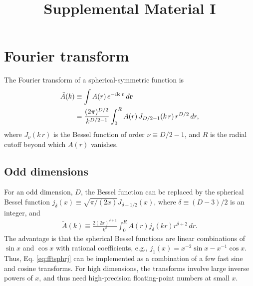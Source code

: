 \documentclass[aip,jcp,preprint,superscriptaddress,showpacs,preprintnumbers,amsmath,amssymb]{revtex4-1}
\numberwithin{equation}{section}
\newcommand{\vct}[1]{\mathbf{#1}}
\providecommand{\vr}{} %
\renewcommand{\vr}{\vct{r}}
\newcommand{\vk}{\vct{k}}
\begin{document}
\title{Supplemental Material I}
\maketitle





\section{Fourier transform}





The Fourier transform of a spherical-symmetric function is
%
%
%
\begin{align}
  \tilde A(k)
&\equiv
  \int A(r) \, e^{-i\vk \cdot \vr} \, d\vr
  \notag \\
&=
  \frac{ (2\pi)^{D/2} }
       { k^{D/2-1} }
  \int_0^R A(r) \, J_{D/2-1}(k \, r) \, r^{D/2} \, dr,
\label{eq:fftsphr}
\end{align}
%
%
%
where $J_\nu(k \, r)$ is the Bessel function
of order $\nu \equiv D/2-1$,
and $R$ is the radial cutoff beyond which $A(r)$ vanishes.





\subsection{Odd dimensions}





For an odd dimension, $D$,
the Bessel function can be replaced
by the spherical Bessel function\cite{arfken}
$j_\delta(x) \equiv \sqrt{\pi/(2x)} J_{\delta + 1/2}(x)$,
where $\delta \equiv (D - 3)/2$ is an integer,
and
%
%
%
\begin{align}
\tilde A(k)
\equiv
\frac{ 2 (2 \pi)^{\delta + 1} }
     { k^\delta }
\int_0^R
A(r) j_\delta(k r) r^{\delta + 2} \, dr.
\label{eq:fftsphrj}
\end{align}
%
%
%
The advantage is that the spherical Bessel functions are
linear combinations of $\sin x$ and $\cos x$
with rational coefficients,
e.g.,
$j_1(x) = x^{-2} \sin x - x^{-1} \cos x$.
%
Thus,
Eq. \eqref{eq:fftsphrj} can be implemented as
a combination of
a few fast sine and cosine transforms\cite{press}.
%
For high dimensions,
the transforms involve large inverse powers of $x$,
and thus need high-precision floating-point numbers
at small $x$.
\end{document}
